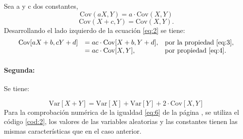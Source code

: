 \documentclass{article}
\begin{document}
Sea a y c dos constantes,
\begin{equation}\label{eq:3}
\text {Cov}(a X,Y)= a \cdot \text{Cov}(X,Y)
\end{equation}
\begin{equation}
\text {Cov}(X+c,Y)= \text{Cov}(X,Y).
\label{eq:4}
\end{equation}
 Desarrollando el lado izquierdo de la ecuación \ref{eq:2} se tiene:
 \begin{equation}
  \begin{array}{cll}
   \text{Cov}[aX + b, cY + d]    & = ac  \cdot \text{Cov}[X+b, Y+d],&\text{por  la propiedad \ref{eq:3}}, \\
      
                        & = ac  \cdot \text{Cov}[X, Y],&\text{por propiedad \ref{eq:4}}.
  \end{array}
 \end{equation}
\paragraph{Segunda:} Se tiene:

\begin{equation}
    \text{Var}[X + Y] = \text{Var}[X] + \text{Var}[Y] + 2\cdot  \text{Cov}[X, Y]
    \label{eq:6}
\end{equation}
Para la comprobación numérica de la igualdad \ref{eq:6} de la página \pageref{eq:6}, se utiliza el código \ref{cod:2}, los valores de las variables aleatorias y las constantes tienen las mismas características que en el caso anterior.
\begin{center}

\label{cod:2}
\end{center}
\end{document}
